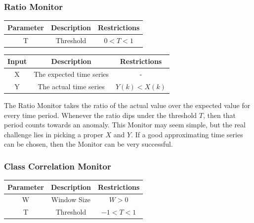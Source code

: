 \documentclass[12pt]{ucthesis}
\begin{document}
\subsubsection{Ratio Monitor}
\label{outage-detection-monitors-Ratio}
\begin{table}[H]
   \begin{center}
      \begin{tabular}{|c|c|c|}
         \hline
            Parameter & Description & Restrictions \\
         \hline
            T & Threshold & $ 0 < T < 1 $\\
         \hline
      \end{tabular}
   \end{center}
\end{table}

\begin{table}[H]
   \begin{center}
      \begin{tabular}{|c|c|c|}
         \hline
            Input & Description & Restrictions \\
         \hline
            X & The expected time series & - \\
         \hline
            Y & The actual time series & $ Y(k) < X(k) $\\
         \hline
      \end{tabular}
   \end{center}
\end{table}

The Ratio Monitor takes the ratio of the actual value over the expected value for every time period.
Whenever the ratio dips under the threshold $T$, then that period counts towards an anomaly.
This Monitor may seem simple, but the real challenge lies in picking a proper $X$ and $Y$.
If a good approximating time series can be chosen, then the Monitor can be very successful.

\subsubsection{Class Correlation Monitor}
\label{outage-detection-monitors-Correlation}
\begin{table}[H]
   \begin{center}
      \begin{tabular}{|c|c|c|}
         \hline
            Parameter & Description & Restrictions \\
         \hline
            W & Window Size & $ W > 0 $\\
         \hline
            T & Threshold & $ -1 < T < 1 $\\
         \hline
      \end{tabular}
   \end{center}
\end{table}
\end{document}
